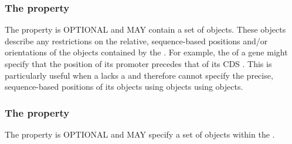 

\subsubsection*{The  property}
\label{sec:constraint}

The  property is OPTIONAL and MAY contain a set of  objects. 
These objects describe any restrictions on the relative, sequence-based positions and/or orientations of the  objects contained by the .
For example, the  of a gene might specify that the position of its promoter  precedes that of its CDS . This is particularly useful when a  lacks a  and therefore cannot specify the precise, sequence-based positions of its  objects using  objects using  objects.

\subsubsection*{The  property}\label{sec:interactions}

The  property is OPTIONAL and MAY specify a set of  objects within the .

